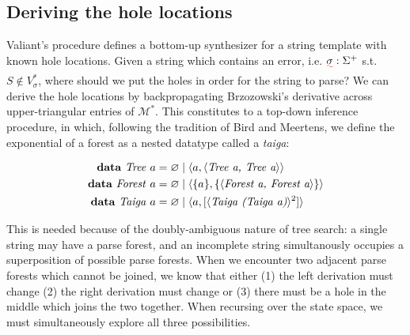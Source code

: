 \documentclass[sigplan,nonacm,anonymous]{acmart}\settopmatter{printfolios=false,printccs=false,printacmref=false}
\begin{document}

  \subsection{Deriving the hole locations}

  Valiant's procedure defines a bottom-up synthesizer for a string template with known hole locations. Given a string which contains an error, i.e. $\squiggly\sigma: \Sigma^+$ s.t. $S \notin V^*_{\sigma}$, where should we put the holes in order for the string to parse? We can derive the hole locations by backpropagating Brzozowski's derivative across upper-triangular entries of $\mathcal{M}^*$. This constitutes to a top-down inference procedure, in which, following the tradition of Bird and Meertens, we define the exponential of a forest as a nested datatype called a \textit{taiga}:

  \begin{align*}
    \text{\textbf{data} \textit{Tree} } a &= \varnothing \mid \langle a, \langle\textit{Tree a, Tree a}\rangle\rangle\\
    \text{\textbf{data} \textit{Forest} } a &= \varnothing \mid \langle \{a\}, \{\langle\textit{Forest a,  Forest a}\rangle\}\rangle\\
    \text{\textbf{data} \textit{Taiga} } a &= \varnothing \mid \langle a, [\langle\textit{Taiga (Taiga a)}\rangle^2]\rangle
  \end{align*}

  This is needed because of the doubly-ambiguous nature of tree search: a single string may have a parse forest, and an incomplete string simultanously occupies a superposition of possible parse forests. When we encounter two adjacent parse forests which cannot be joined, we know that either (1) the left derivation must change (2) the right derivation must change or (3) there must be a hole in the middle which joins the two together. When recursing over the state space, we must simultaneously explore all three possibilities.
\end{document}
